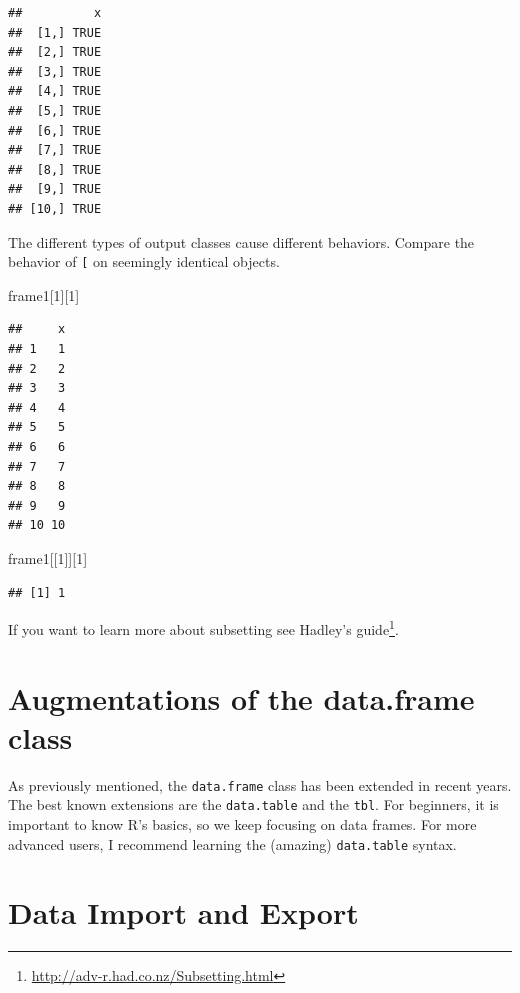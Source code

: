 \documentclass[]{book}
\newenvironment{Shaded}{\begin{snugshade}}{\end{snugshade}}
\newcommand{\DecValTok}[1]{\textcolor[rgb]{0.00,0.00,0.81}{#1}}
\newcommand{\NormalTok}[1]{#1}
\renewcommand{\href}[2]{#2\footnote{\url{#1}}}
\theoremstyle{definition}
\theoremstyle{definition}
\theoremstyle{definition}
\theoremstyle{remark}
\begin{document}
\begin{verbatim}
##          x
##  [1,] TRUE
##  [2,] TRUE
##  [3,] TRUE
##  [4,] TRUE
##  [5,] TRUE
##  [6,] TRUE
##  [7,] TRUE
##  [8,] TRUE
##  [9,] TRUE
## [10,] TRUE
\end{verbatim}

The different types of output classes cause different behaviors. Compare the behavior of \texttt{{[}} on seemingly identical objects.

\begin{Shaded}
\begin{Highlighting}[]
\NormalTok{frame1[}\DecValTok{1}\NormalTok{][}\DecValTok{1}\NormalTok{]}
\end{Highlighting}
\end{Shaded}

\begin{verbatim}
##     x
## 1   1
## 2   2
## 3   3
## 4   4
## 5   5
## 6   6
## 7   7
## 8   8
## 9   9
## 10 10
\end{verbatim}

\begin{Shaded}
\begin{Highlighting}[]
\NormalTok{frame1[[}\DecValTok{1}\NormalTok{]][}\DecValTok{1}\NormalTok{]}
\end{Highlighting}
\end{Shaded}

\begin{verbatim}
## [1] 1
\end{verbatim}

If you want to learn more about subsetting see \href{http://adv-r.had.co.nz/Subsetting.html}{Hadley's guide}.

\hypertarget{augmentations-of-the-data.frame-class}{%
\section{Augmentations of the data.frame class}\label{augmentations-of-the-data.frame-class}}

As previously mentioned, the \texttt{data.frame} class has been extended in recent years.
The best known extensions are the \texttt{data.table} and the \texttt{tbl}.
For beginners, it is important to know R's basics, so we keep focusing on data frames.
For more advanced users, I recommend learning the (amazing) \texttt{data.table} syntax.

\hypertarget{data-import-and-export}{%
\section{Data Import and Export}\label{data-import-and-export}}
\end{document}
